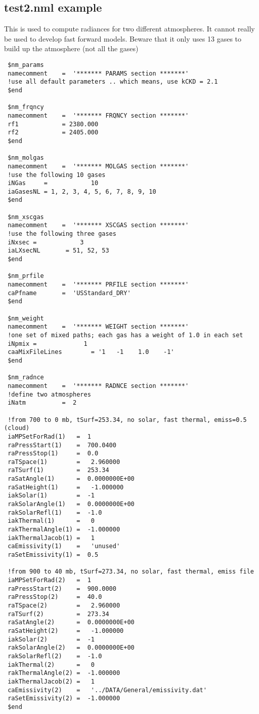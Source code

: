 \documentclass[11pt]{article}
\begin{document}
\subsection{test2.nml example}
This is used to compute radiances for two different atmospheres. It cannot
really be used to develop fast forward models. Beware that it only uses 13 
gases to build up the atmosphere (not all the gases)


\begin{verbatim}
 $nm_params
 namecomment    =  '******* PARAMS section *******'
 !use all default parameters .. which means, use kCKD = 2.1
 $end

 $nm_frqncy
 namecomment    =  '******* FRQNCY section *******'
 rf1            = 2380.000
 rf2            = 2405.000
 $end

 $nm_molgas
 namecomment    =  '******* MOLGAS section *******'
 !use the following 10 gases
 iNGas     =            10
 iaGasesNL = 1, 2, 3, 4, 5, 6, 7, 8, 9, 10
 $end

 $nm_xscgas
 namecomment    =  '******* XSCGAS section *******'
 !use the following three gases
 iNxsec =            3
 iaLXsecNL       = 51, 52, 53
 $end

 $nm_prfile
 namecomment    =  '******* PRFILE section *******'
 caPfname       =  'USStandard_DRY'
 $end

 $nm_weight
 namecomment    =  '******* WEIGHT section *******'
 !one set of mixed paths; each gas has a weight of 1.0 in each set
 iNpmix =             1
 caaMixFileLines        = '1   -1    1.0    -1'
 $end

 $nm_radnce
 namecomment    =  '******* RADNCE section *******'
 !define two atmospheres
 iNatm          =  2

 !from 700 to 0 mb, tSurf=253.34, no solar, fast thermal, emiss=0.5 (cloud)
 iaMPSetForRad(1)   =  1
 raPressStart(1)    =  700.0400
 raPressStop(1)     =  0.0
 raTSpace(1)        =   2.960000
 raTSurf(1)         =  253.34
 raSatAngle(1)      =  0.0000000E+00
 raSatHeight(1)     =   -1.000000
 iakSolar(1)        =  -1
 rakSolarAngle(1)   =  0.0000000E+00
 rakSolarRefl(1)    =  -1.0
 iakThermal(1)      =   0
 rakThermalAngle(1) =  -1.000000
 iakThermalJacob(1) =   1
 caEmissivity(1)    =   'unused'
 raSetEmissivity(1) =  0.5

 !from 900 to 40 mb, tSurf=273.34, no solar, fast thermal, emiss file
 iaMPSetForRad(2)   =  1
 raPressStart(2)    =  900.0000
 raPressStop(2)     =  40.0
 raTSpace(2)        =   2.960000
 raTSurf(2)         =  273.34
 raSatAngle(2)      =  0.0000000E+00
 raSatHeight(2)     =   -1.000000
 iakSolar(2)        =  -1
 rakSolarAngle(2)   =  0.0000000E+00
 rakSolarRefl(2)    =  -1.0
 iakThermal(2)      =   0
 rakThermalAngle(2) =  -1.000000
 iakThermalJacob(2) =   1
 caEmissivity(2)    =   '../DATA/General/emissivity.dat'
 raSetEmissivity(2) =  -1.000000
 $end


\end{verbatim}
\end{document}
